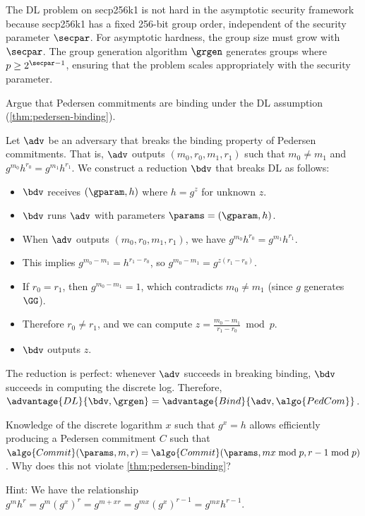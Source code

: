 \ifsolutions
\begin{mysolution}
  The DL problem on secp256k1 is not hard in the asymptotic security framework because secp256k1 has a fixed 256-bit group order, independent of the security parameter $\secpar$.
  For asymptotic hardness, the group size must grow with $\secpar$.
  The group generation algorithm $\grgen$ generates groups where $p \geq 2^{\secpar-1}$, ensuring that the problem scales appropriately with the security parameter.
\end{mysolution}
\fi

\begin{exercise}\label{ex:pedersen-binding}
  Argue that Pedersen commitments are binding under the DL assumption (\autoref{thm:pedersen-binding}).
\end{exercise}

\ifsolutions
\begin{mysolution}
  Let $\adv$ be an adversary that breaks the binding property of Pedersen commitments.
  That is, $\adv$ outputs $(m_0, r_0, m_1, r_1)$ such that $m_0 \neq m_1$ and $g^{m_0}h^{r_0} = g^{m_1}h^{r_1}$.
  We construct a \ppt reduction $\bdv$ that breaks DL as follows:
  \begin{itemize}
    \item $\bdv$ receives $(\gparam, h)$ where $h = g^z$ for unknown $z$.
    \item $\bdv$ runs $\adv$ with parameters $\params = (\gparam, h)$.
    \item When $\adv$ outputs $(m_0, r_0, m_1, r_1)$, we have $g^{m_0}h^{r_0} = g^{m_1}h^{r_1}$.
    \item This implies $g^{m_0 - m_1} = h^{r_1 - r_0}$, so $g^{m_0 - m_1} = g^{z(r_1 - r_0)}$.
    \item If $r_0 = r_1$, then $g^{m_0 - m_1} = 1$, which contradicts $m_0 \neq m_1$ (since $g$ generates $\GG$).
    \item Therefore $r_0 \neq r_1$, and we can compute $z = \frac{m_0 - m_1}{r_1 - r_0} \bmod p$.
    \item $\bdv$ outputs $z$.
  \end{itemize}
  The reduction is perfect: whenever $\adv$ succeeds in breaking binding, $\bdv$ succeeds in computing the discrete log.
  Therefore, $\advantage{DL}{\bdv, \grgen} = \advantage{Bind}{\adv, \algo{PedCom}}$.
\end{mysolution}
\fi

\begin{exercise}[Optional]
  Knowledge of the discrete logarithm $x$ such that $g^x = h$ allows efficiently producing a Pedersen commitment $C$ such that $\algo{Commit}(\params, m, r) = \algo{Commit}(\params, mx \bmod p, r - 1 \bmod p)$.
  Why does this not violate \autoref{thm:pedersen-binding}?
  
  Hint: We have the relationship $g^m h^r = g^m (g^x)^r = g^{m + xr} = g^{mx} (g^x)^{r-1} = g^{mx} h^{r-1}$.
\end{exercise}

